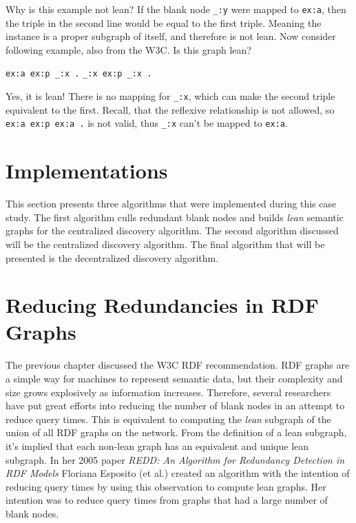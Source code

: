 Why is this example not lean? If the blank node \texttt{\_:y} were mapped to \texttt{ex:a}, then the triple in the second line would be equal to the first triple. Meaning the instance is a proper subgraph of itself, and therefore is not lean. Now consider following example, also from the W3C\cite{RDFSemantics.Hayes.2014}. Is this graph lean? \newline

\begin{center}
\texttt{ex:a  ex:p  \_:x .} \newline
\texttt{\_:x  ex:p  \_:x .} \newline
\end{center}

Yes, it is lean! There is no mapping for \texttt{\_:x}, which can make the second triple equivalent to the first. Recall, that the reflexive relationship is not allowed, so \texttt{ex:a  ex:p  ex:a .} is not valid, thus \texttt{\_:x} can't be mapped to \texttt{ex:a}.

\section{Implementations}
This section presents three algorithms that were implemented during this case study. The first algorithm culls redundant blank nodes and builds \textit{lean} semantic graphs for the centralized discovery algorithm. The second algorithm discussed will be the centralized discovery algorithm. The final algorithm that will be presented is the decentralized discovery algorithm.


\section{Reducing Redundancies in RDF Graphs}
\label{graphlean}
The previous chapter discussed the W3C RDF recommendation. RDF graphs are a simple way for machines to represent semantic data, but their complexity and size grows explosively as information increases. Therefore, several researchers have put great efforts into reducing the number of blank nodes in an attempt to reduce query times\cite{Esposito.2005}. This is equivalent to computing the \textit{lean} subgraph of the union of all RDF graphs on the network. From the definition of a lean subgraph, it's implied that each non-lean graph has an equivalent and unique lean subgraph\cite{Cyganiak.2014}. In her 2005 paper \textit{REDD: An Algorithm for Redundancy Detection in RDF Models} Floriana Esposito (et al.) \cite{Esposito.2005} created an algorithm with the intention of reducing query times by using this observation to compute lean graphs. Her intention was to reduce query times from graphs that had a large number of blank nodes.



